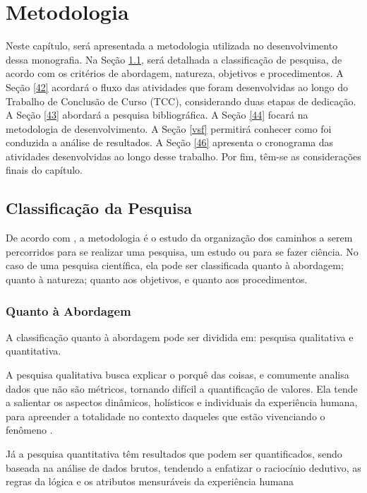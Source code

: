 \chapter[Metodologia]{Metodologia}
\label{ch:metodologia}

Neste capítulo, será apresentada a metodologia utilizada no desenvolvimento dessa 
monografia. Na Seção \ref{41}, será detalhada a classificação de pesquisa, de acordo com os 
critérios de abordagem, natureza, objetivos e procedimentos. A Seção \ref{42} acordará o fluxo 
das atividades que foram desenvolvidas ao longo do Trabalho de Conclusão de Curso (TCC), considerando duas etapas de dedicação. 
A Seção \ref{43} abordará a pesquisa bibliográfica.
A Seção \ref{44} focará na metodologia de desenvolvimento. A Seção \ref{vsf} permitirá conhecer como foi conduzida 
a análise de resultados. A Seção \ref{46} apresenta o cronograma das atividades desenvolvidas ao 
longo desse trabalho. Por fim, têm-se as considerações finais do capítulo.


\section{Classificação da Pesquisa}
\label{41}
De acordo com , a metodologia é o estudo da organização dos 
caminhos a serem percorridos para se realizar uma pesquisa, um estudo ou para se 
fazer ciência. No caso de uma pesquisa científica, ela pode ser classificada quanto à 
abordagem; quanto à natureza; quanto aos objetivos, e quanto aos procedimentos.

\subsection{Quanto à Abordagem}

A classificação quanto à abordagem pode ser dividida em: pesquisa qualitativa e quantitativa. 

A pesquisa qualitativa busca explicar o porquê das coisas, e 
comumente analisa dados que não são métricos, tornando difícil 
a quantificação de valores. Ela tende a salientar os
aspectos dinâmicos, holísticos e individuais da experiência humana, para apreender
a totalidade no contexto daqueles que estão vivenciando o fenômeno \cite{gerhardt2009}.

Já a pesquisa quantitativa têm resultados que podem ser quantificados, sendo baseada na 
análise de dados brutos, tendendo a enfatizar o raciocínio dedutivo, as regras da lógica 
e os atributos mensuráveis da experiência humana

